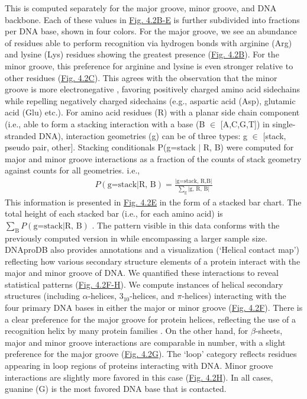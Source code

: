 This is computed separately for the major groove, minor groove, and DNA backbone. Each of these values in \hyperref[fig:dnaprodb2]{Fig. 4.2B-E} is further subdivided into fractions per DNA base, shown in four colors. For the major groove, we see an abundance of residues able to perform recognition via hydrogen bonds with arginine (Arg) and lysine (Lys) residues showing the greatest presence (\hyperref[fig:dnaprodb2]{Fig. 4.2B}). For the minor groove, this preference for arginine and lysine is even stronger relative to other residues (\hyperref[fig:dnaprodb2]{Fig. 4.2C}). This agrees with the observation that the minor groove is more electronegative \citep{rohs2009role}, favoring positively charged amino acid sidechains while repelling negatively charged sidechains (e.g., aspartic acid (Asp), glutamic acid (Glu) etc.). 
For amino acid residues (R) with a planar side chain component (i.e., able to form a stacking interaction with a base (B $\in$ [A,C,G,T]) in single-stranded DNA), interaction geometries (g) can be of three types: g $\in$ [stack, pseudo pair, other]. Stacking conditionals P(g=stack $|$ R, B) were computed for major and minor groove interactions as a fraction of the counts of stack geometry against counts for all geometries. i.e.,
\begin{align}
P(\text{g=stack} | \text{R, B})= \frac{|\text{g=stack, R,B}|}{\sum\limits_\text{g}|\text{g, R, B}| }
\end{align}
This information is presented in \hyperref[fig:dnaprodb2]{Fig. 4.2E} in the form of a stacked bar chart. The total height of each stacked bar (i.e., for each amino acid) is $\sum\limits_\text{B}P(\text{g=stack} | \text{R, B})$ . The pattern visible in this data conforms with the previously computed version in \citep{Sagendorf2020} while encompassing a larger sample size.
DNAproDB also provides annotations and a visualization (‘Helical contact map’) reflecting how various secondary structure elements of a protein interact with the major and minor groove of DNA. We quantified these interactions to reveal statistical patterns (\hyperref[fig:dnaprodb2]{Fig. 4.2F-H}). We compute instances of helical secondary structures (including $\alpha$-helices, $3_{10}$-helices, and $\pi$-helices) interacting with the four primary DNA bases in either the major or minor groove (\hyperref[fig:dnaprodb2]{Fig. 4.2F}). There is a clear preference for the major groove for protein helices, reflecting the use of a recognition helix by many protein families \citep{Garvie2001}. On the other hand, for $\beta$-sheets, major and minor groove interactions are comparable in number, with a slight preference for the major groove (\hyperref[fig:dnaprodb2]{Fig. 4.2G}). The ‘loop’ category reflects residues appearing in loop regions of proteins interacting with DNA. Minor groove interactions are slightly more favored in this case (\hyperref[fig:dnaprodb2]{Fig. 4.2H}). In all cases, guanine (G) is the most favored DNA base that is contacted. 

